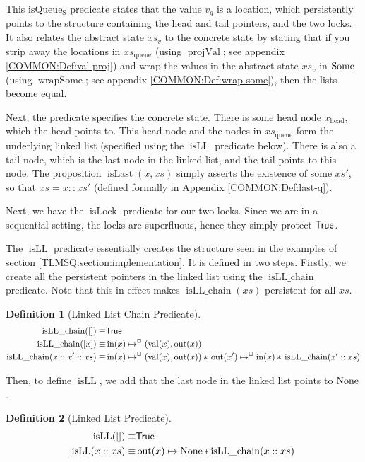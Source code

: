 \documentclass[a4paper, 10pt]{report}
\theoremstyle{definition}
\newtheorem{definition}{Definition}[section]
\newcommand{\isLock}{\operatorname{isLock}}
\newcommand{\isqueueseq}{\operatorname{isQueue_{S}}}
\newcommand{\vq}{v_q}
\newcommand{\xsc}{xs}
\newcommand{\xsqueue}{xs_{\mathrm{queue}}}
\newcommand{\isLLchain}{\operatorname{isLL\_chain}}
\newcommand{\isLL}{\operatorname{isLL}}
\newcommand{\projval}{\operatorname{projVal}}
\newcommand{\wrapsome}{\operatorname{wrapSome}}
\newcommand{\isLast}{\operatorname{isLast}}
\newcommand{\nIn}[1]{\operatorname{in}(#1)}
\newcommand{\nVal}[1]{\operatorname{val}(#1)}
\newcommand{\nOut}[1]{\operatorname{out}(#1)}
\newcommand{\node}{x}
\newcommand{\nodeN}[1]{\node_{\mathrm{#1}}}
\newcommand{\nodehead}{\nodeN{head}}
\newcommand{\absvalueList}{xs_v}
\newcommand{\isNode}[1]{\nIn{#1} \mapsto^{\persistently} (\nVal{#1}, \nOut{#1})}
\begin{document}
This $\isqueueseq$ predicate states that the value $\vq$ is a location, which persistently points to the structure containing the head and tail pointers, and the two locks. It also relates the abstract state $\absvalueList$ to the concrete state by stating that if you strip away the locations in $\xsqueue$ (using $\projval$; see appendix \ref{COMMON:Def:val-proj}) and wrap the values in the abstract state $\absvalueList$ in $\operatorname{Some}$ (using $\wrapsome$; see appendix \ref{COMMON:Def:wrap-some}), then the lists become equal.

Next, the predicate specifies the concrete state. There is some head node $\nodehead$, which the head points to. This head node and the nodes in $\xsqueue$ form the underlying linked list (specified using the $\isLL$ predicate below). There is also a tail node, which is the last node in the linked list, and the tail points to this node. The proposition $\isLast(\node, \xsc)$ simply asserts the existence of some $\xsc'$, so that $\xsc = \node :: \xsc'$ (defined formally in Appendix \ref{COMMON:Def:last-q}).

Next, we have the $\isLock$ predicate for our two locks. Since we are in a sequential setting, the locks are superfluous, hence they simply protect $\textsf{True}$.

The $\isLL$ predicate essentially creates the structure seen in the examples of section \ref{TLMSQ:section:implementation}. It is defined in two steps. Firstly, we create all the persistent pointers in the linked list using the $\isLLchain$ predicate. Note that this in effect makes $\isLLchain(\xsc)$ persistent for all $\xsc$.
\begin{definition}[Linked List Chain Predicate]
  \begin{align*}
    \isLLchain([]) \equiv& \TRUE\\
    \isLLchain([\node]) \equiv& \isNode{\node}\\
    \isLLchain(\node :: \node' :: \xsc) \equiv& \isNode{\node} \star{} \nOut{\node'} \mapsto^{\persistently} \nIn{\node} \star{} \isLLchain(\node' :: \xsc)
  \end{align*}
\end{definition}

Then, to define $\isLL$, we add that the last node in the linked list points to $\operatorname{None}$.
\begin{definition}[Linked List Predicate]
  \begin{align*}
    \isLL([]) \equiv& \TRUE\\
    \isLL(\node :: \xsc) \equiv& \nOut{\node} \mapsto \None \star{} \isLLchain(\node :: \xsc)
  \end{align*}
\end{definition}
\end{document}
